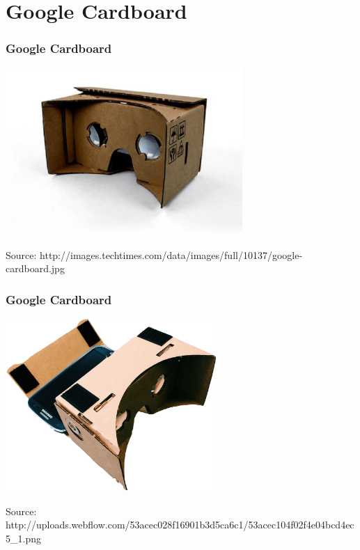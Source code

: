 \section{Google Cardboard}

\begin{frame}
\frametitle{Google Cardboard}

\begin{center}
  \includegraphics[width=9cm]{figs/google-cardboard.jpg}
\end{center}


\begin{flushright}
{\tiny
Source: http://images.techtimes.com/data/images/full/10137/google-cardboard.jpg
}
\end{flushright}

\end{frame}



\begin{frame}
\frametitle{Google Cardboard}

\begin{center}
  \includegraphics[width=8cm]{figs/google-cardboard2.jpg}
\end{center}


\begin{flushright}
{\tiny
Source: http://uploads.webflow.com/53acec028f16901b3d5ca6c1/53acec104f02f4e04bcd4ec5\_1.png
}
\end{flushright}

\end{frame}


